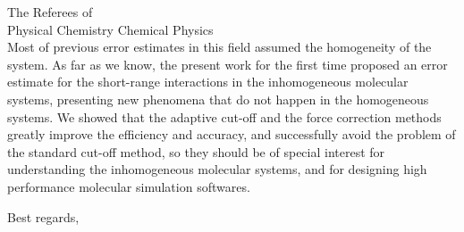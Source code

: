 \documentclass{letter}
\begin{document}
\begin{letter}{
    The Referees of\\
    Physical Chemistry Chemical Physics\\
    \vskip 1cm
  }
Most of previous error estimates in this field assumed the homogeneity
of the system. As far as we know, the present work for the first time
proposed an error estimate for the short-range interactions in the
inhomogeneous molecular systems, presenting new phenomena that do not
happen in the homogeneous systems.  We showed that the adaptive cut-off
and the force correction methods greatly improve the efficiency and
accuracy, and successfully avoid the problem of the standard cut-off
method, so they should be of special interest for
understanding the inhomogeneous molecular systems, and for
designing high
performance molecular simulation softwares.
\\
\vskip 3cm

\closing{Best regards,}


\end{letter} 
\end{document}
